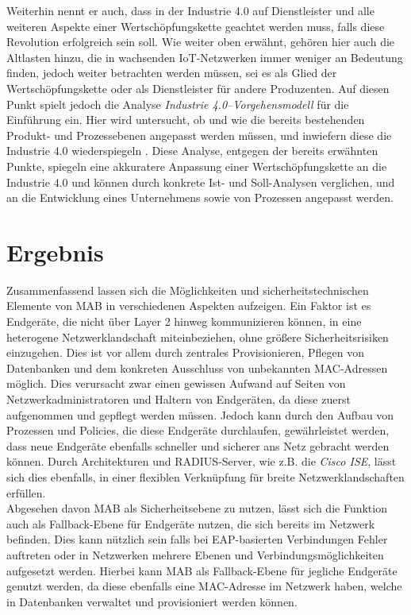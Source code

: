 \documentclass[conference]{IEEEtran}
\begin{document}
Weiterhin nennt er auch, dass in der Industrie 4.0 auf Dienstleister und alle weiteren Aspekte einer Wertschöpfungskette geachtet werden muss, falls diese Revolution erfolgreich sein soll. Wie weiter oben erwähnt, gehören hier auch die Altlasten hinzu, die in wachsenden IoT-Netzwerken immer weniger an Bedeutung finden, jedoch weiter betrachten werden müssen, sei es als Glied der Wertschöpfungskette oder als Dienstleister für andere Produzenten. Auf diesen Punkt spielt jedoch die Analyse \emph{Industrie 4.0–Vorgehensmodell} für die Einführung ein. %
Hier wird untersucht, ob und wie die bereits bestehenden Produkt- und Prozessebenen angepasst werden müssen, und inwiefern diese die Industrie 4.0 wiederspiegeln \cite{lucia2016industrie}. Diese Analyse, entgegen der bereits erwähnten Punkte, spiegeln eine akkuratere Anpassung einer Wertschöpfungskette an die Industrie 4.0 und können durch konkrete Ist- und Soll-Analysen verglichen, und an die Entwicklung eines Unternehmens sowie von Prozessen angepasst werden.\\

%

\vspace{1em}
\section{Ergebnis}
Zusammenfassend lassen sich die Möglichkeiten und sicherheitstechnischen Elemente von MAB in verschiedenen Aspekten aufzeigen. Ein Faktor ist es Endgeräte, die nicht über Layer 2 hinweg kommunizieren können, in eine heterogene Netzwerklandschaft miteinbeziehen, ohne größere Sicherheitsrisiken einzugehen. Dies ist vor allem durch zentrales Provisionieren, Pflegen von Datenbanken und dem konkreten Ausschluss von unbekannten MAC-Adressen möglich. Dies verursacht zwar einen gewissen Aufwand auf Seiten von Netzwerkadministratoren und Haltern von Endgeräten, da diese zuerst aufgenommen und gepflegt werden müssen. Jedoch kann durch den Aufbau von Prozessen und Policies, die diese Endgeräte durchlaufen, gewährleistet werden, dass neue Endgeräte ebenfalls schneller und sicherer ans Netz gebracht werden können. Durch Architekturen und RADIUS-Server, wie z.B. die \emph{Cisco ISE}, lässt sich dies ebenfalls, in einer flexiblen Verknüpfung für breite Netzwerklandschaften erfüllen.\\

Abgesehen davon MAB als Sicherheitsebene zu nutzen, lässt sich die Funktion auch als Fallback-Ebene für Endgeräte nutzen, die sich bereits im Netzwerk befinden. Dies kann nützlich sein falls bei EAP-basierten Verbindungen Fehler auftreten oder in Netzwerken mehrere Ebenen und Verbindungsmöglichkeiten aufgesetzt werden. Hierbei kann MAB als Fallback-Ebene für jegliche Endgeräte genutzt werden, da diese ebenfalls eine MAC-Adresse im Netzwerk haben, welche in Datenbanken verwaltet und provisioniert werden können.\\
\end{document}

